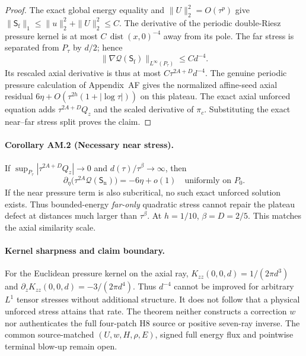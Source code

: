 \begin{proof}
The exact global energy equality and $\|U\|_2^2=O(\tau^p)$ give
$\|\mathsf S_{\mathrm f}\|_1\le\|u\|_2^2+\|U\|_2^2\le C$.
The derivative of the periodic double-Riesz pressure kernel is at most $C\,\operatorname{dist}(x,0)^{-4}$ away from its pole. The far stress is separated from $P_\tau$ by $d/2$; hence
\[
\|\nabla\mathcal Q(\mathsf S_{\mathrm f})\|_{L^\infty(P_\tau)}
\le Cd^{-4}.
\]
Its rescaled axial derivative is thus at most $C\tau^{2A+D}d^{-4}$.
The genuine periodic pressure calculation of Appendix~AF gives the normalized affine-seed axial residual
$6\eta+O(\tau^{2h}(1+|\log\tau|))$ on this plateau. The exact axial unforced equation adds $\tau^{2A+D}Q_z$ and the scaled derivative of $\pi_c$. Substituting the exact near--far stress split proves the claim.
\end{proof}

\paragraph{Corollary AM.2 (Necessary near stress).}
If $\sup_{P_\tau}|\tau^{2A+D}Q_z|\to0$ and
$d(\tau)/\tau^\beta\to\infty$, then
\[
\partial_\eta\bigl(\tau^{2A}\mathcal Q(\mathsf S_{\mathrm n})\bigr)
=-6\eta+o(1)\quad\text{uniformly on }P_0.
\]
If the near pressure term is also subcritical, no such exact unforced solution exists. Thus bounded-energy \emph{far-only} quadratic stress cannot repair the plateau defect at distances much larger than $\tau^\beta$. At $h=1/10$,
$\boxed{\beta=D=2/5}$. This matches the axial similarity scale.

\paragraph{Kernel sharpness and claim boundary.}
For the Euclidean pressure kernel on the axial ray,
$K_{zz}(0,0,d)=1/(2\pi d^3)$ and
$\partial_zK_{zz}(0,0,d)=-3/(2\pi d^4)$.
Thus $d^{-4}$ cannot be improved for arbitrary $L^1$ tensor stresses without additional structure. It does not follow that a physical unforced stress attains that rate. The theorem neither constructs a correction $w$ nor authenticates the full four-patch H8 source or positive seven-ray inverse. The common source-matched $(U,w,H,\rho,E)$, signed full energy flux and pointwise terminal blow-up remain open.
